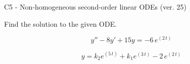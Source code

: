 \begin{exercise}
  \begin{exerciseTitle}C5 - Non-homogeneous second-order linear ODEs (ver. 25)\end{exerciseTitle}
  \begin{exerciseStatement}
    
Find the solution to the given ODE.

    
\[y''-8y'+15y = -6 \, e^{\left(2 \, t\right)}\]

  \end{exerciseStatement}
  \begin{exerciseAnswer}
    
\[y= k_{2} e^{\left(5 \, t\right)} + k_{1} e^{\left(3 \, t\right)} - 2 \, e^{\left(2 \, t\right)}\]

  \end{exerciseAnswer}
\end{exercise}